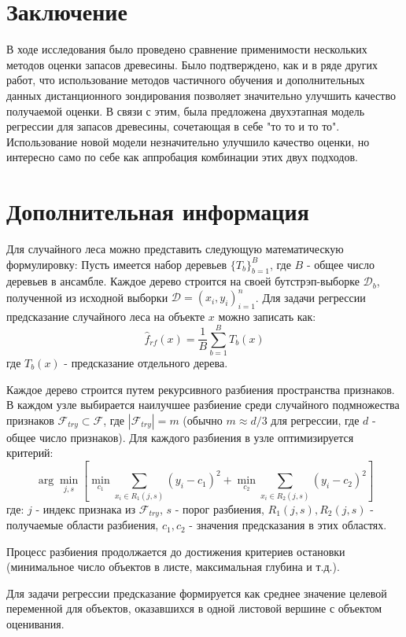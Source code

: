 \documentclass{article}
\begin{document}
\section*{Заключение}
В ходе исследования было проведено сравнение применимости нескольких методов оценки запасов древесины. Было подтверждено, как и в ряде других работ, что использование методов частичного обучения и дополнительных данных дистанционного зондирования позволяет значительно улучшить качество получаемой оценки. В связи с этим, была предложена двухэтапная модель регрессии для запасов древесины, сочетающая в себе "то то и то то". Использование новой модели незначительно улучшило качество оценки, но интересно само по себе как аппробация комбинации этих двух подходов. 

\section*{Дополнительная информация}
Для случайного леса можно представить следующую математическую формулировку:
Пусть имеется набор деревьев $\{T_b\}_{b=1}^B$, где $B$ - общее число деревьев в ансамбле. Каждое дерево строится на своей бутстрэп-выборке $\mathcal{D}_b$, полученной из исходной выборки $\mathcal{D} = {(x_i, y_i)}_{i=1}^n$.
Для задачи регрессии предсказание случайного леса на объекте $x$ можно записать как:
$$\hat{f}_{rf}(x) = \frac{1}{B}\sum_{b=1}^B T_b(x)$$
где $T_b(x)$ - предсказание отдельного дерева.

Каждое дерево строится путем рекурсивного разбиения пространства признаков. В каждом узле выбирается наилучшее разбиение среди случайного подмножества признаков $\mathcal{F}_{try} \subset \mathcal{F}$, где $|\mathcal{F}_{try}| = m$ (обычно $m \approx d / 3$ для регрессии, где $d$ - общее число признаков).
Для каждого разбиения в узле оптимизируется критерий:
$$\arg \min_{j,s} \left[\min_{c_1}\sum_{x_i \in R_1(j,s)}(y_i - c_1)^2 + \min_{c_2}\sum_{x_i \in R_2(j,s)}(y_i - c_2)^2\right]$$
где: $j$ - индекс признака из $\mathcal{F}_{try}$, $s$ - порог разбиения, $R_1(j,s), R_2(j,s)$ - получаемые области разбиения, $c_1, c_2$ - значения предсказания в этих областях.

Процесс разбиения продолжается до достижения критериев остановки (минимальное число объектов в листе, максимальная глубина и т.д.).

Для задачи регрессии предсказание формируется как среднее значение целевой переменной для объектов, оказавшихся в одной листовой вершине с объектом оценивания.


\clearpage


\end{document}
